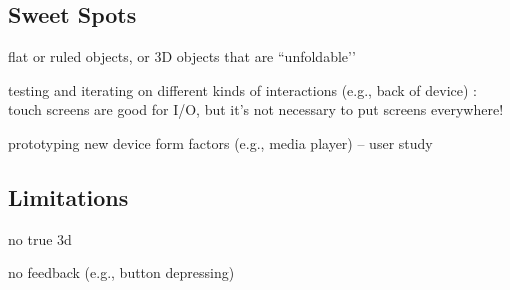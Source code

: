 \subsection{Sweet Spots}

flat or ruled objects, or 3D objects that are ``unfoldable’’

testing and iterating on different kinds of interactions (e.g., back of device) : touch screens are good for I/O, but it's not necessary to put screens everywhere!

prototyping new device form factors (e.g., media player) -- user study

\subsection{Limitations}

no true 3d

no feedback (e.g., button depressing)